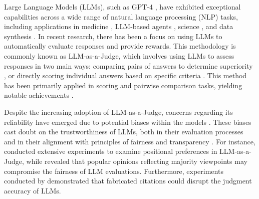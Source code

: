 \documentclass{article} %
\begin{document}
Large Language Models (LLMs), such as GPT-4 \citep{openai2024gpt4report}, have exhibited exceptional capabilities across a wide range of natural language processing (NLP) tasks, including applications in medicine \citep{liu2023deidgptzeroshotmedicaltext}, LLM-based agents \citep{huang2024metatoolbenchmarklargelanguage, guo2024largelanguagemodelbased, chen2024internet, chen2024guiworlddatasetguiorientedmultimodal}, science \citep{NEURIPS2023_bbb33018, li2024ithinkiam, chen2024scholarchemqaunveilingpowerlanguage, le2024molxenhancinglargelanguage}, and data synthesis \citep{zhao2024self, wu2024unigenunifiedframeworktextual}. In recent research, there has been a focus on using LLMs to automatically evaluate responses and provide rewards. This methodology is commonly known as LLM-as-a-Judge, which involves using LLMs to assess responses in two main ways: comparing pairs of answers to determine superiority \citep{zheng2024judging}, or directly scoring individual answers based on specific criteria \citep{liu2023alignbenchbenchmarkingchinesealignment}. This method has been primarily applied in scoring and pairwise comparison tasks, yielding notable achievements \citep{kasner2024traditionalbenchmarksanalyzingbehaviors, liu2023alignbenchbenchmarkingchinesealignment}.




Despite the increasing adoption of LLM-as-a-Judge, concerns regarding its reliability have emerged due to potential biases within the models \citep{zheng2024judging, chen2024humansllmsjudgestudy, wang2023largelanguagemodelsfair, koo2023benchmarkingcognitivebiaseslarge}. These biases cast doubt on the trustworthiness of LLMs, both in their evaluation processes and in their alignment with principles of fairness and transparency \citep{sun2024trustllmtrustworthinesslargelanguage, huang2023trustgptbenchmarktrustworthyresponsible}. For instance, \citet{zheng2024judging} conducted extensive experiments to examine positional preferences in LLM-as-a-Judge, while \citet{koo2023benchmarkingcognitivebiaseslarge} revealed that popular opinions reflecting majority viewpoints may compromise the fairness of LLM evaluations. Furthermore, experiments conducted by \citet{chen2024humansllmsjudgestudy} demonstrated that fabricated citations could disrupt the judgment accuracy of LLMs.
\end{document}

